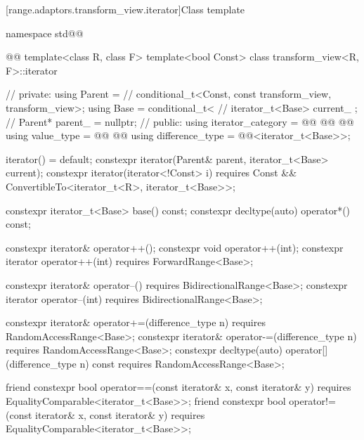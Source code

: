 [range.adaptors.transform_view.iterator]{Class template }

\pnum
{}

\begin{codeblock}
namespace std@@ { @@
  template<class R, class F>
  template<bool Const>
  class transform_view<R, F>::iterator { // \expos
  private:
    using Parent =                 // \expos
      conditional_t<Const, const transform_view, transform_view>;
    using Base   = conditional_t<  // \expos
    iterator_t<Base> current_ {};  // \expos
    Parent* parent_ = nullptr;     // \expos
  public:
    using iterator_category = @\newtxt{\seebelownc;}@
      @@
    @@
    using value_type        =
      @@
      @@
    using difference_type   = @@<iterator_t<Base>>;

    iterator() = default;
    constexpr iterator(Parent& parent, iterator_t<Base> current);
    constexpr iterator(iterator<!Const> i)
      requires Const && ConvertibleTo<iterator_t<R>, iterator_t<Base>>;

    constexpr iterator_t<Base> base() const;
    constexpr decltype(auto) operator*() const;

    constexpr iterator& operator++();
    constexpr void operator++(int);
    constexpr iterator operator++(int) requires ForwardRange<Base>;

    constexpr iterator& operator--() requires BidirectionalRange<Base>;
    constexpr iterator operator--(int) requires BidirectionalRange<Base>;

    constexpr iterator& operator+=(difference_type n)
      requires RandomAccessRange<Base>;
    constexpr iterator& operator-=(difference_type n)
      requires RandomAccessRange<Base>;
    constexpr decltype(auto) operator[](difference_type n) const
      requires RandomAccessRange<Base>;

    friend constexpr bool operator==(const iterator& x, const iterator& y)
      requires EqualityComparable<iterator_t<Base>>;
    friend constexpr bool operator!=(const iterator& x, const iterator& y)
      requires EqualityComparable<iterator_t<Base>>;

}}
\end{codeblock}
